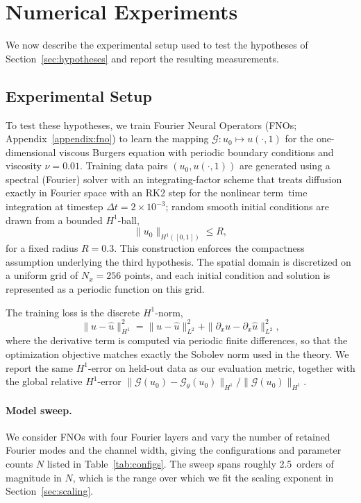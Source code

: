 \documentclass[11pt]{article}
\newcommand{\nuval}{0.01}
\newcommand{\dtval}{2\times 10^{-3}}
\newcommand{\timescheme}{an integrating-factor scheme that treats diffusion
  exactly in Fourier space with an RK2 step for the nonlinear term}
\newcommand{\gridres}{256}
\newcommand{\sweepdecades}{2.5}
\theoremstyle{plain}
\theoremstyle{definition}
\theoremstyle{remark}
\begin{document}
\section{Numerical Experiments}
\label{sec:experiments}
We now describe the experimental setup used to test the hypotheses of
Section~\ref{sec:hypotheses} and report the resulting measurements.

\subsection{Experimental Setup}
To test these hypotheses, we train Fourier Neural Operators (FNOs;
Appendix~\ref{appendix:fno}) to learn the mapping
$\mathcal{G} : u_0 \mapsto u(\cdot, 1)$ for the one-dimensional viscous
Burgers equation with periodic boundary conditions and viscosity
$\nu = \nuval$. Training data pairs $(u_0, u(\cdot,1))$ are generated using a
spectral (Fourier) solver with \timescheme\ time integration at timestep
$\Delta t = \dtval$; random smooth initial conditions are drawn from a bounded
$H^1$-ball,
\[
\|u_0\|_{H^1([0,1])} \leq R,
\]
for a fixed radius $R = 0.3$. This construction enforces the compactness
assumption underlying the third hypothesis. The spatial domain is discretized
on a uniform grid of $N_x = \gridres$ points, and each initial condition and
solution is represented as a periodic function on this grid.

The training loss is the discrete $H^1$-norm,
\[
\|u - \hat{u}\|_{H^1}^2 = \|u - \hat{u}\|_{L^2}^2
  + \|\partial_x u - \partial_x \hat{u}\|_{L^2}^2,
\]
where the derivative term is computed via periodic finite differences, so that
the optimization objective matches exactly the Sobolev norm used in the
theory. We report the same $H^1$-error on held-out data as our evaluation
metric, together with the global relative $H^1$-error
$\|\mathcal{G}(u_0) - \mathcal{G}_\theta(u_0)\|_{H^1} /
\|\mathcal{G}(u_0)\|_{H^1}$.

\paragraph{Model sweep.}
We consider FNOs with four Fourier layers and vary the number of retained
Fourier modes and the channel width, giving the configurations and parameter
counts $N$ listed in Table~\ref{tab:configs}. The sweep spans roughly
\sweepdecades\ orders of magnitude in $N$, which is the range over which we fit
the scaling exponent in Section~\ref{sec:scaling}.
\end{document}
